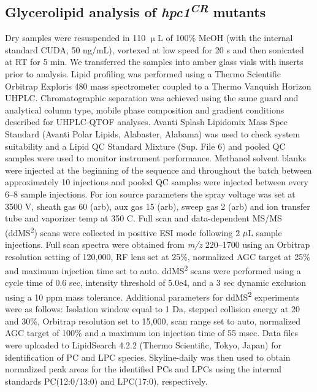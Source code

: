 \documentclass[9pt,twocolumn,twoside,lineno]{biorxiv}
\begin{document}
\subsection{Glycerolipid analysis of \textit{hpc1\textsuperscript{CR}} mutants}
Dry samples were resuspended in 110 $\upmu$L of 100\% MeOH (with the internal standard CUDA, 50 ng/mL), vortexed at low speed for 20 s and then sonicated at RT for 5 min. 
We transferred the samples into amber glass vials with inserts prior to analysis. 
Lipid profiling was performed using a Thermo Scientific Orbitrap Exploris 480 mass spectrometer coupled to a Thermo Vanquish Horizon UHPLC. 
Chromatographic separation was achieved using the same guard and analytical column type, mobile phase composition and gradient conditions described for UHPLC-QTOF analyses. 
Avanti Splash Lipidomix Mass Spec Standard (Avanti Polar Lipids, Alabaster, Alabama) was used to check system suitability and a Lipid QC Standard Mixture (Sup. File 6) and pooled QC samples were used to monitor instrument performance. 
Methanol solvent blanks were injected at the beginning of the sequence and throughout the batch between approximately 10 injections and pooled QC samples were injected between every 6–8 sample injections. 
For ion source parameters the spray voltage was set at 3500 V, sheath gas 60 (arb), aux gas 15 (arb), sweep gas 2 (arb) and ion transfer tube and vaporizer temp at 350 \degree C. 
Full scan and data-dependent MS/MS (ddMS\textsuperscript{2}) scans were collected in positive ESI mode following 2 $\mu$L sample injections. 
Full scan spectra were obtained from \textit{m/z} 220--1700 using an Orbitrap resolution setting of 120,000, RF lens set at 25\%, normalized AGC target at 25\% and maximum injection time set to auto. 
ddMS\textsuperscript{2} scans were performed using a cycle time of 0.6 sec, intensity threshold of 5.0e4, and a 3 sec dynamic exclusion using a 10 ppm mass tolerance. 
Additional parameters for ddMS\textsuperscript{2} experiments were as follows: Isolation window equal to 1 Da, stepped collision energy at 20 and 30\%, Orbitrap resolution set to 15,000, scan range set to auto, normalized AGC target of 100\% and a maximum ion injection time of 55 msec. 
Data files were uploaded to LipidSearch 4.2.2 (Thermo Scientific, Tokyo, Japan) for identification of PC and LPC species. 
Skyline-daily \cite{Adams2020-em} was then used to obtain normalized peak areas for the identified PCs and LPCs using the internal standards PC(12:0/13:0) and LPC(17:0), respectively.
\end{document}
